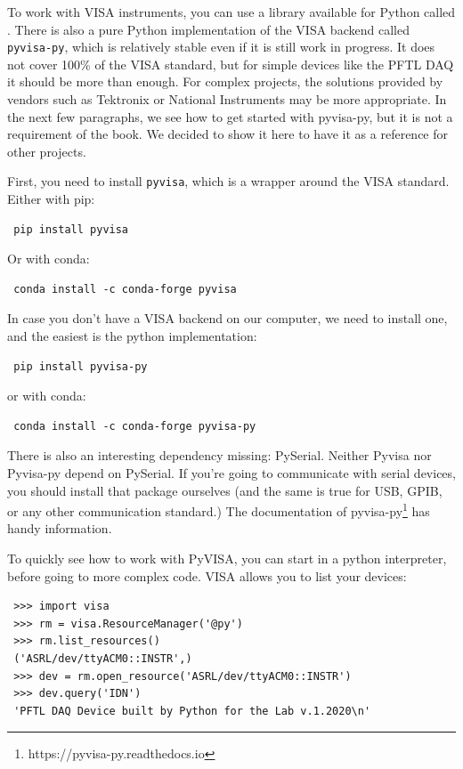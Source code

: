 To work with VISA instruments, you can use a library available for Python called . There is also a pure Python implementation of the VISA backend called \texttt{pyvisa-py}, which is relatively stable even if it is still work in progress. It does not cover 100\% of the VISA standard, but for simple devices like the {PFTL DAQ} it should be more than enough. For complex projects, the solutions provided by vendors such as Tektronix or National Instruments may be more appropriate. In the next few paragraphs, we see how to get started with pyvisa-py, but it is not a requirement of the book. We decided to show it here to have it as a reference for other projects.

First, you need to install \texttt{pyvisa}, which is a wrapper around the VISA standard. Either with pip:

\begin{verbatim}
 pip install pyvisa
\end{verbatim}

Or with conda:

\begin{verbatim}
 conda install -c conda-forge pyvisa
\end{verbatim}

In case you don't have a VISA backend on our computer, we need to install one, and the easiest is the python implementation:

\begin{verbatim}
 pip install pyvisa-py
\end{verbatim}

or with conda:

\begin{verbatim}
 conda install -c conda-forge pyvisa-py
\end{verbatim}

There is also an interesting dependency missing: PySerial. Neither Pyvisa nor Pyvisa-py depend on PySerial. If you're going to communicate with serial devices, you should install that package ourselves (and the same is true for USB, GPIB, or any other communication standard.) The documentation of pyvisa-py\footnote{https://pyvisa-py.readthedocs.io} has handy information.

To quickly see how to work with PyVISA, you can start in a python interpreter, before going to more complex code. VISA allows you to list your devices:

\begin{verbatim}
 >>> import visa
 >>> rm = visa.ResourceManager('@py')
 >>> rm.list_resources()
 ('ASRL/dev/ttyACM0::INSTR',)
 >>> dev = rm.open_resource('ASRL/dev/ttyACM0::INSTR')
 >>> dev.query('IDN')
 'PFTL DAQ Device built by Python for the Lab v.1.2020\n'
\end{verbatim}

